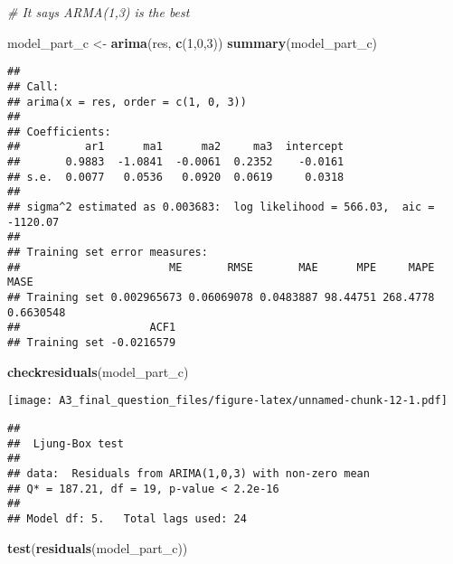 \documentclass[]{article}
\newenvironment{Shaded}{\begin{snugshade}}{\end{snugshade}}
\newcommand{\CommentTok}[1]{\textcolor[rgb]{0.56,0.35,0.01}{\textit{#1}}}
\newcommand{\DecValTok}[1]{\textcolor[rgb]{0.00,0.00,0.81}{#1}}
\newcommand{\KeywordTok}[1]{\textcolor[rgb]{0.13,0.29,0.53}{\textbf{#1}}}
\newcommand{\NormalTok}[1]{#1}
\newcommand{\StringTok}[1]{\textcolor[rgb]{0.31,0.60,0.02}{#1}}
\begin{document}
\begin{Shaded}
\begin{Highlighting}[]
\CommentTok{# It says ARMA(1,3) is the best}
\end{Highlighting}
\end{Shaded}

\begin{Shaded}
\begin{Highlighting}[]
\NormalTok{model_part_c <-}\StringTok{ }\KeywordTok{arima}\NormalTok{(res, }\KeywordTok{c}\NormalTok{(}\DecValTok{1}\NormalTok{,}\DecValTok{0}\NormalTok{,}\DecValTok{3}\NormalTok{))}
\KeywordTok{summary}\NormalTok{(model_part_c)}
\end{Highlighting}
\end{Shaded}

\begin{verbatim}
## 
## Call:
## arima(x = res, order = c(1, 0, 3))
## 
## Coefficients:
##          ar1      ma1      ma2     ma3  intercept
##       0.9883  -1.0841  -0.0061  0.2352    -0.0161
## s.e.  0.0077   0.0536   0.0920  0.0619     0.0318
## 
## sigma^2 estimated as 0.003683:  log likelihood = 566.03,  aic = -1120.07
## 
## Training set error measures:
##                       ME       RMSE       MAE      MPE     MAPE      MASE
## Training set 0.002965673 0.06069078 0.0483887 98.44751 268.4778 0.6630548
##                    ACF1
## Training set -0.0216579
\end{verbatim}

\begin{Shaded}
\begin{Highlighting}[]
\KeywordTok{checkresiduals}\NormalTok{(model_part_c)}
\end{Highlighting}
\end{Shaded}

\texttt{[image: A3\_final\_question\_files/figure-latex/unnamed-chunk-12-1.pdf]}

\begin{verbatim}
## 
##  Ljung-Box test
## 
## data:  Residuals from ARIMA(1,0,3) with non-zero mean
## Q* = 187.21, df = 19, p-value < 2.2e-16
## 
## Model df: 5.   Total lags used: 24
\end{verbatim}

\begin{Shaded}
\begin{Highlighting}[]
\KeywordTok{test}\NormalTok{(}\KeywordTok{residuals}\NormalTok{(model_part_c))}
\end{Highlighting}
\end{Shaded}
\end{document}
